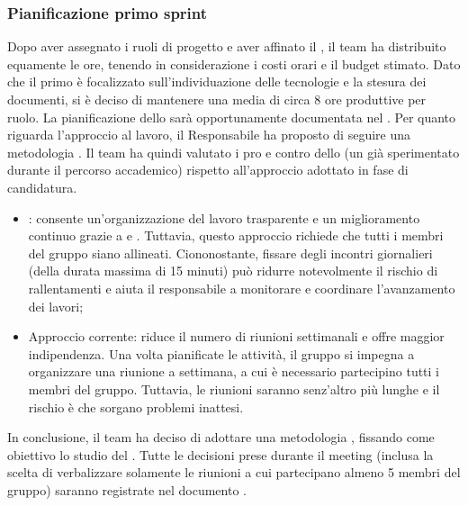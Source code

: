 \subsubsection{Pianificazione primo sprint}
Dopo aver assegnato i ruoli di progetto e aver affinato il \glossario{\WoW}, il team ha distribuito equamente le ore, tenendo in considerazione i costi orari e il budget stimato. Dato che il primo  è focalizzato sull'individuazione delle tecnologie e la stesura dei documenti, si è deciso di mantenere una media di circa 8 ore produttive per ruolo. La pianificazione dello  sarà opportunamente documentata nel \PdP. Per quanto riguarda l'approccio al lavoro, il Responsabile ha proposto di seguire una metodologia . Il team ha quindi valutato i pro e contro dello  (un  già sperimentato durante il percorso accademico) rispetto all'approccio adottato in fase di candidatura.
\begin{itemize}
	\item {}: consente un'organizzazione del lavoro trasparente e un miglioramento continuo grazie a  e . Tuttavia, questo approccio richiede che tutti i membri del gruppo siano allineati. Ciononostante, fissare degli incontri giornalieri (della durata massima di 15 minuti) può ridurre notevolmente il rischio di rallentamenti e aiuta il responsabile a monitorare e coordinare l'avanzamento dei lavori;
	\item Approccio corrente: riduce il numero di riunioni settimanali e offre maggior indipendenza. Una volta pianificate le attività, il gruppo si impegna a organizzare una riunione a settimana, a cui è necessario partecipino tutti i membri del gruppo. Tuttavia, le riunioni saranno senz'altro più lunghe e il rischio è che sorgano problemi inattesi.
\end{itemize}

\vspace{0.5\baselineskip}
In conclusione, il team ha deciso di adottare una metodologia , fissando come obiettivo lo studio del  . Tutte le decisioni prese durante il meeting (inclusa la scelta di verbalizzare solamente le riunioni a cui partecipano almeno 5 membri del gruppo) saranno registrate nel documento \NdP.
\clearpage
